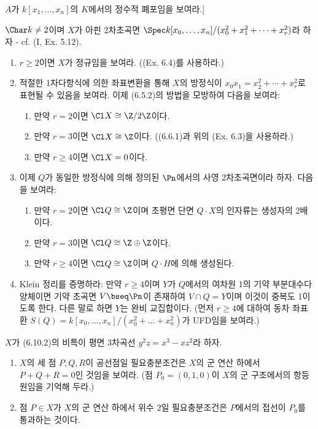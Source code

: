 \begin{enumerate}[label=\tb{6.\arabic*.},itemindent=0mm,itemsep=2mm]
	$A$가 $k[x_1,\ldots,x_n]$의 $K$에서의 정수적 폐포임을 보여라.]
	{\renewcommand{\labelenumi}{\tb{*6.\arabic{enumi}.}}
	\item {} $\Char k\ne 2$이며 $X$가 아핀 2차초곡면 $\Spec k[x_0,\ldots,x_n]/(x_0^2+x_1^2+\cdots+x_r^2)$라 하자
	- cf. (I, Ex. 5.12).
	\begin{enumerate}[label=(\alph*)]
	\item $r\ge 2$이면 $X$가 정규임을 보여라. ((Ex. 6.4)를 사용하라.)
	\item 적절한 1차다항식에 의한 좌표변환을 통해 $X$의 방정식이 $x_0x_1=x_2^2+\cdots+x_r^2$로 표현될 수 있음을 보여라.
	이제 (6.5.2)의 방법을 모방하여 다음을 보여라:
	\begin{enumerate}[label=(\arabic*)]
	\item 만약 $r=2$이면 $\Cl X\cong\Z/2\Z$이다.
	\item 만약 $r=3$이면 $\Cl X\cong\Z$이다. ((6.6.1)과 위의 (Ex. 6.3)을 사용하라.)
	\item 만약 $r\ge 4$이면 $\Cl X=0$이다.
	\end{enumerate}
	\item 이제 $Q$가 동일한 방정식에 의해 정의된 $\Pn$에서의 사영 2차초곡면이라 하자. 다음을 보여라:
	\begin{enumerate}[label=(\arabic*)]
	\item 만약 $r=2$이면 $\Cl Q\cong\Z$이며 초평면 단면 $Q\cdot X$의 인자류는 생성자의 2배이다.
	\item 만약 $r=3$이면 $\Cl Q\cong\Z\oplus\Z$이다.
	\item 만약 $r\ge 4$이면 $\Cl Q\cong\Z$이며 $Q\cdot H$에 의해 생성된다.
	\end{enumerate}
	\item Klein 정리를 증명하라: 만약 $r\ge 4$이며 $Y$가 $Q$에서의 여차원 1의 기약 부분대수다양체이면
	기약 초곡면 $V\bseq\Pn$이 존재하여 $V\cap Q=Y$이며 이것이 중복도 1이도록 한다. 다른 말로 하면 $Y$는 완비 교집합이다.
	(먼저 $r\ge 4$에 대하여 동차 좌표환 $S(Q)=k[x_0,\ldots,x_n]/(x_0^2+\ldots+x_n^2)$가 UFD임을 보여라.)
	\end{enumerate}}
	\item $X$가 (6.10.2)의 비특이 평면 3차곡선 $y^2z=x^3-xz^2$라 하자.
	\begin{enumerate}[label=(\alph*)]
	\item $X$의 세 점 $P,Q,R$이 공선점일 필요충분조건은 $X$의 군 연산 하에서 $P+Q+R=0$인 것임을 보여라.
	(점 $P_0=(0,1,0)$이 $X$의 군 구조에서의 항등원임을 기억해 두라.)
	\item 점 $P\in X$가 $X$의 군 연산 하에서 위수 2일 필요충분조건은 $P$에서의 접선이 $P_0$를 통과하는 것이다.

\end{enumerate}
\end{enumerate}
